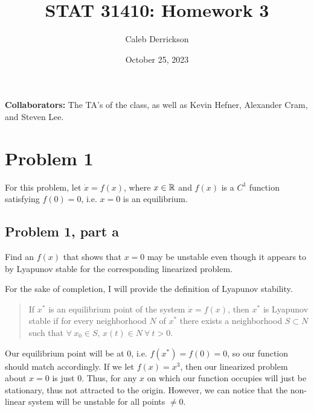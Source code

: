 

\title{STAT 31410: Homework 3}
\author{Caleb Derrickson}
\date{October 25, 2023}


\onehalfspacing
\maketitle

{\color{cit}\vspace{2mm}\noindent\textbf{Collaborators:}} The TA's of the class, as well as Kevin Hefner, Alexander Cram, and Steven Lee.

\tableofcontents

\newpage
\section{Problem 1}
For this problem, let $\dot{x} = f(x)$, where $x \in \mathbb{R}$ and $f(x)$ is a $C^1$ function satisfying $f(0) = 0$, i.e. $x = 0$ is an equilibrium. 

\subsection{Problem 1, part a}
Find an $f(x)$ that shows that $x = 0$ may be unstable even though it appears to by Lyapunov stable for the corresponding linearized problem.

\partbreak
\begin{solution}

    For the sake of completion, I will provide the definition of Lyapunov stability.

    \alignbreak
    \vspace{-8mm}
    \begin{quote}
        If $x^*$ is an equilibrium point of the system $\dot{x} = f(x)$, then $x^*$ is Lyapunov stable if for every neighborhood $N$ of $x^*$ there exists a neighborhood $S\subset N$ such that $\forall \ x_0 \in S$, $x(t) \in N \ \forall \ t > 0$.   
    \end{quote}
    \vspace{-8mm}
    \alignbreak

    Our equilibrium point will be at 0, i.e. $f(x^*) = f(0) = 0$, so our function should match accordingly. If we let $f(x) = x^3$, then our linearized problem about $x = 0$ is just 0. Thus, for any $x$ on which our function occupies will just be stationary, thus not attracted to the origin.
    However, we can notice that the non-linear system will be unstable for all points $\neq 0$. 
\end{solution}

